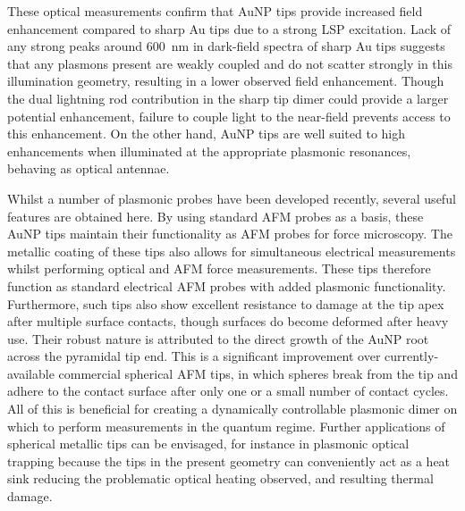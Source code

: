\documentclass{article}
\begin{document}
These optical measurements confirm that AuNP tips provide increased field enhancement compared to sharp Au tips due to a strong LSP excitation. Lack of any strong peaks around \SI{600}{nm} in dark-field spectra of sharp Au tips suggests that any plasmons present are weakly coupled and do not scatter strongly in this illumination geometry, resulting in a lower observed field enhancement. Though the dual lightning rod contribution in the sharp tip dimer could provide a larger potential enhancement, failure to couple light to the near-field prevents access to this enhancement. On the other hand, AuNP tips are well suited to high enhancements when illuminated at the appropriate plasmonic resonances, behaving as optical antennae.

Whilst a number of plasmonic probes have been developed recently, several useful features are obtained here. By using standard AFM probes as a basis, these AuNP tips maintain their functionality as AFM probes for force microscopy. The metallic coating of these tips also allows for simultaneous electrical measurements whilst performing optical and AFM force measurements. These tips therefore function as standard electrical AFM probes with added plasmonic functionality.
Furthermore, such tips also show excellent resistance to damage at the tip apex after multiple surface contacts, though surfaces do become deformed after heavy use. Their robust nature is attributed to the direct growth of the AuNP root across the pyramidal tip end. This is a significant improvement over currently-available commercial spherical AFM tips, in which spheres break from the tip and adhere to the contact surface after only one or a small number of contact cycles. All of this is beneficial for creating a dynamically controllable plasmonic dimer on which to perform measurements in the quantum regime.
Further applications of spherical metallic tips can be envisaged, for instance in plasmonic optical trapping \cite{lindquist2013} because the tips in the present geometry can conveniently act as a heat sink reducing the problematic optical heating observed, and resulting thermal damage.
\end{document}
